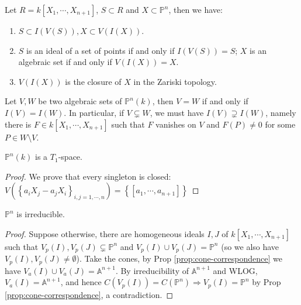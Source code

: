 \documentclass{note-eng}
\begin{document}
\begin{proposition}
    Let $R = k[X_1, \cdots, X_{n + 1}]$, $S \subset R$ and $X \subset \mathbb{P}^n$, then we have:
    \begin{enumerate}
        \item $S \subset I(V(S)), X \subset V(I(X))$.
        \item $S$ is an ideal of a set of points if and only if $I(V(S)) = S$; $X$ is an algebraic set if and only if $V(I(X)) = X$.
        \item $V(I(X))$ is the closure of $X$ in the Zariski topology.
    \end{enumerate}
\end{proposition}

\begin{corollary}
    Let $V, W$ be two algebraic sets of $\mathbb{P}^n(k)$, then $V = W$ if and only if $I(V) = I(W)$. In particular, if $V \subsetneq W$, we must have $I(V) \supsetneq I(W)$, namely there is $F \in k[X_1, \cdots, X_{n + 1}]$ such that $F$ vanishes on $V$ and $F(P) \ne 0$ for some $P \in W \setminus V$.
\end{corollary}

\begin{proposition}
    $\mathbb{P}^n(k)$ is a $T_1$-space.
\end{proposition}

\begin{proof}
    We prove that every singleton is closed: $V(\left\lbrace a_i X_j - a_j X_i \right\rbrace_{i, j = 1, \cdots, n}) = \left\lbrace [a_1, \cdots, a_{n + 1}] \right\rbrace$
\end{proof}

\begin{proposition}
    $\mathbb{P}^n$ is irreducible.
\end{proposition}

\begin{proof}
    Suppose otherwise, there are homogeneous ideals $I, J$ of $k[X_1, \cdots, X_{n + 1}]$ such that $V_p(I), V_p(J) \subsetneq \mathbb{P}^n$ and $V_p(I) \cup V_p(J) = \mathbb{P}^n$ (so we also have $V_p(I), V_p(J) \ne \emptyset$). Take the cones, by Prop \ref{prop:cone-correspondence} we have $V_a(I) \cup V_a(J) = \mathbb{A}^{n + 1}$. By irreducibility of $\mathbb{A}^{n + 1}$ and WLOG, $V_a(I) = \mathbb{A}^{n + 1}$, and hence $C(V_p(I)) = C(\mathbb{P}^{n}) \Rightarrow V_p(I) = \mathbb{P}^{n}$ by Prop \ref{prop:cone-correspondence}, a contradiction.
\end{proof}
\end{document}
